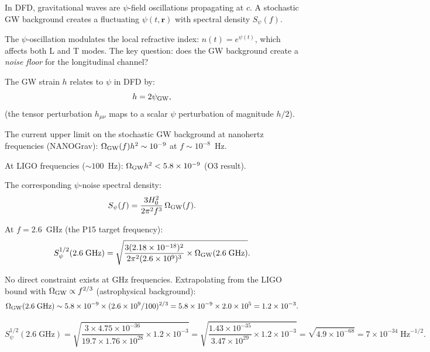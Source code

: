\documentclass[11pt]{article}
\newcommand{\ee}[1]{\times 10^{#1}}
\begin{document}
In DFD, gravitational waves are $\psi$-field oscillations propagating
at $c$. A stochastic GW background creates a fluctuating $\psi(t,\mathbf{r})$
with spectral density $S_\psi(f)$.

The $\psi$-oscillation modulates the local refractive index:
$n(t) = e^{\psi(t)}$, which affects both L and T modes. The key
question: does the GW background create a \textit{noise floor} for
the longitudinal channel?

The GW strain $h$ relates to $\psi$ in DFD by:
\begin{equation}
h = 2\psi_{\rm GW},
\end{equation}
(the tensor perturbation $h_{\mu\nu}$ maps to a scalar $\psi$
perturbation of magnitude $h/2$).

The current upper limit on the stochastic GW background at
nanohertz frequencies (NANOGrav): $\Omega_{\rm GW}(f) h^2
\sim 10^{-9}$ at $f \sim 10^{-8}$~Hz.

At LIGO frequencies ($\sim 100$~Hz): $\Omega_{\rm GW} h^2
< 5.8\ee{-9}$ (O3 result).

The corresponding $\psi$-noise spectral density:
\begin{equation}
S_\psi(f) = \frac{3H_0^2}{2\pi^2 f^3}\,\Omega_{\rm GW}(f).
\end{equation}

At $f = 2.6$~GHz (the P15 target frequency):
\begin{equation}
S_\psi^{1/2}(2.6\;\text{GHz}) = \sqrt{\frac{3(2.18\ee{-18})^2}
{2\pi^2 (2.6\ee{9})^3} \times \Omega_{\rm GW}(2.6\;\text{GHz})}.
\end{equation}

No direct constraint exists at GHz frequencies. Extrapolating
from the LIGO bound with $\Omega_{\rm GW} \propto f^{2/3}$
(astrophysical background):
\begin{equation}
\Omega_{\rm GW}(2.6\;\text{GHz}) \sim 5.8\ee{-9}
\times (2.6\ee{9}/100)^{2/3} = 5.8\ee{-9} \times 2.0\ee{5}
= 1.2\ee{-3}.
\end{equation}

\begin{equation}
S_\psi^{1/2}(2.6\;\text{GHz}) = \sqrt{\frac{3 \times 4.75\ee{-36}}
{19.7 \times 1.76\ee{28}} \times 1.2\ee{-3}}
= \sqrt{\frac{1.43\ee{-35}}{3.47\ee{29}} \times 1.2\ee{-3}}
= \sqrt{4.9\ee{-68}} = 7\ee{-34}\;\text{Hz}^{-1/2}.
\end{equation}
\end{document}

